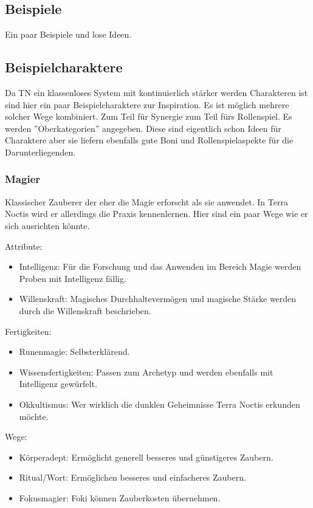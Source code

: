 \documentclass{article}
\begin{document}
\begin{center}
\section{Beispiele}
\end{center}

Ein paar Beispiele und lose Ideen.

\begin{center}
\subsection{Beispielcharaktere}
\end{center}

Da TN ein klassenloses System mit kontinuierlich stärker werden Charakteren ist sind hier ein paar Beispielcharaktere
zur Inspiration. Es ist möglich mehrere solcher Wege kombiniert. Zum Teil für Synergie zum Teil fürs Rollenspiel.
Es werden ''Oberkategorien'' angegeben. Diese sind eigentlich schon Ideen für Charaktere aber sie liefern ebenfalls
gute Boni und Rollenspielaspekte für die Darunterliegenden.


\subsubsection{Magier}
Klassischer Zauberer der eher die Magie erforscht als sie anwendet.
In Terra Noctis wird er allerdings die Praxis kennenlernen. Hier sind ein paar Wege wie er sich ausrichten könnte.

Attribute:
\begin{itemize}
\item Intelligenz: Für die Forschung und das Anwenden im Bereich Magie werden Proben mit Intelligenz fällig.
\item Willenskraft: Magisches Durchhaltevermögen und magische Stärke werden durch die Willenskraft beschrieben.
\end{itemize}

Fertigkeiten:
\begin{itemize}
\item Runenmagie: Selbsterklärend.
\item Wissensfertigkeiten: Passen zum Archetyp und werden ebenfalls mit Intelligenz gewürfelt.
\item Okkultismus: Wer wirklich die dunklen Geheimnisse Terra Noctis erkunden möchte.
\end{itemize}

Wege:
\begin{itemize}
\item Körperadept: Ermöglicht generell besseres und günstigeres Zaubern.
\item Ritual/Wort: Ermöglichen besseres und einfacheres Zaubern.
\item Fokusmagier: Foki können Zauberkosten übernehmen.
\end{itemize}
\end{document}
